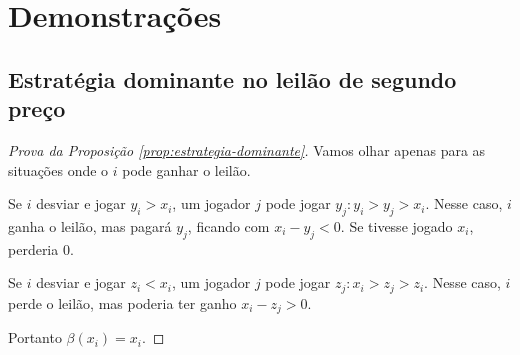 \chapter{Demonstrações}
\label{cap:apendice}

\section{Estratégia dominante no leilão de segundo preço}
\begin{proof}[Prova da Proposição \ref{prop:estrategia-dominante}]
	Vamos olhar apenas para as situações onde o $i$ pode ganhar o leilão.
	
	Se $i$ desviar e jogar $y_i > x_i$, um jogador $j$ pode jogar $y_j : y_i > y_j > x_i$. Nesse caso, $i$ ganha o leilão, mas pagará $y_j$, ficando com $x_i - y_j < 0$. Se tivesse jogado $x_i$, perderia 0.
	
	Se $i$ desviar e jogar $z_i < x_i$, um jogador $j$ pode jogar $z_j : x_i > z_j > z_i$. Nesse caso, $i$ perde o leilão, mas poderia ter ganho $x_i - z_j > 0$.
	
	Portanto $\beta(x_i) = x_i$.
\end{proof}

